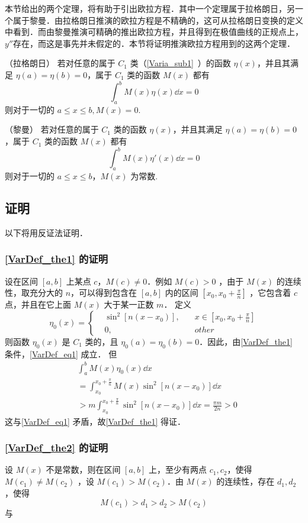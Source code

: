 
\begin{issues}
\issueTODO
\end{issues}

本节给出的两个定理，将有助于引出欧拉方程．其中一个定理属于拉格朗日，另一个属于黎曼．由拉格朗日推演的欧拉方程是不精确的，这可从拉格朗日变换的定义中看到．而由黎曼推演可精确的推出欧拉方程，并且得到在极值曲线的正规点上，$y''$存在，而这是事先并未假定的．本节将证明推演欧拉方程用到的这两个定理．

\begin{theorem}{（拉格朗日）}\label{VarDef_the1}
若对任意的属于 $C_1$ 类（\autoref{Varia_sub1}~）的函数 $\eta(x)$，并且其满足 $\eta(a)=\eta(b)=0$，属于 $C_1$ 类的函数 $M(x)$ 都有
\begin{equation}\label{VarDef_eq1}
\int_a^b M(x)\eta(x)\dd x=0
\end{equation}
则对于一切的 $a\leq x\leq b,M(x)=0$.
\end{theorem}
\begin{theorem}{（黎曼）}\label{VarDef_the2}
若对任意的属于 $C_1$ 类的函数 $\eta(x)$，并且其满足 $\eta(a)=\eta(b)=0$，属于 $C_1$ 类的函数 $M(x)$ 都有
\begin{equation}
\int_a^b M(x)\eta'(x)\dd x=0
\end{equation}
则对于一切的 $a\leq x\leq b$，$M(x)$ 为常数.
\end{theorem}
\subsection{证明}
以下将用反证法证明．
\subsubsection{\autoref{VarDef_the1} 的证明}
设在区间 $[a,b]$  上某点 $c$，$M(c)\neq0$．例如 $M(c)>0$ ，由于 $M(x)$ 的连续性，取充分大的 $n$，可以得到包含在 $[a,b]$ 内的区间 $[x_0,x_0+\frac{\pi}{n}]$ ，它包含着 $c$ 点，并且在它上面 $M(x)$ 大于某一正数 $m$．
定义
\begin{equation}
\eta_0(x)=\begin{cases}
&\sin^2[n(x-x_0)],\quad &x\in[x_0,x_0+\frac{\pi}{n}]\\
&0,\quad &other
\end{cases}
\end{equation}
则函数 $\eta_0(x)$ 是 $C_1$ 类的，且 $\eta_0(a)=\eta_0(b)=0$．因此，由\autoref{VarDef_the1} 条件，\autoref{VarDef_eq1} 成立．
但
\begin{equation}
\begin{aligned}
&\int_a^b M(x)\eta_0(x)\dd x\\
&=\int_{x_0}^{x_0+\frac{\pi}{n}}M(x)\sin^2[n(x-x_0)]\dd x\\
&>m\int_{x_0}^{x_0+\frac{\pi}{n}}\sin^2[n(x-x_0)]\dd x=\frac{\pi m}{2n}>0
\end{aligned}
\end{equation}
这与\autoref{VarDef_eq1} 矛盾，故\autoref{VarDef_the1} 得证．
\subsubsection{\autoref{VarDef_the2} 的证明}
设 $M(x)$ 不是常数，则在区间 $[a,b]$ 上，至少有两点 $c_1,c_2$，使得 $M(c_1)\neq M(c_2)$ ，设 $M(c_1)>M(c_2)$．由 $M(x)$ 的连续性，存在 $d_1,d_2$，使得
\begin{equation}
M(c_1)>d_1>d_2>M(c_2)
\end{equation}
与